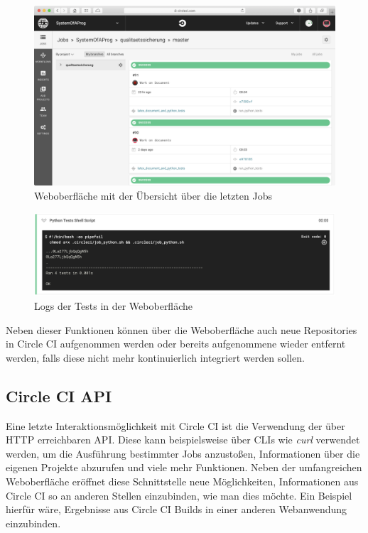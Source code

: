 \documentclass[11pt]{article}
\begin{document}
\begin{figure}[H]
	\centering
  	\includegraphics[width=1\linewidth]{../Images/Weboberflaeche}
  	\caption{Weboberfläche mit der Übersicht über die letzten Jobs}
  	\label{fig:weboberflaeche}
\end{figure}

\begin{figure}[H]
	\centering
  	\includegraphics[width=1\linewidth]{../Images/Test_Logs}
  	\caption{Logs der Tests in der Weboberfläche}
  	\label{fig:testlogs}
\end{figure}

Neben dieser Funktionen können über die Weboberfläche auch neue Repositories in Circle CI aufgenommen werden oder bereits aufgenommene wieder entfernt werden, falls diese nicht mehr kontinuierlich integriert werden sollen.

\subsection{Circle CI API}
Eine letzte Interaktionsmöglichkeit mit Circle CI ist die Verwendung der über HTTP erreichbaren API. Diese kann beispielsweise über CLIs wie \textit{curl} verwendet werden, um die Ausführung bestimmter Jobs anzustoßen, Informationen über die eigenen Projekte abzurufen und viele mehr Funktionen. Neben der umfangreichen Weboberfläche eröffnet diese Schnittstelle neue Möglichkeiten, Informationen aus Circle CI so an anderen Stellen einzubinden, wie man dies möchte. Ein Beispiel hierfür wäre, Ergebnisse aus Circle CI Builds in einer anderen Webanwendung einzubinden.
\end{document}
